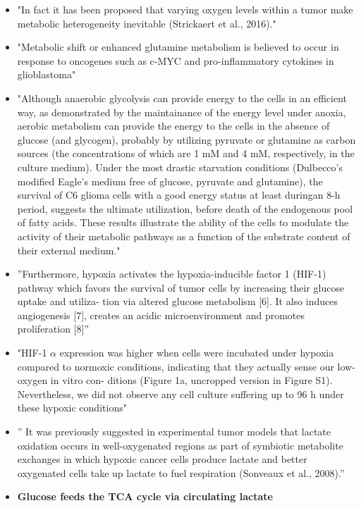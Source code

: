 \documentclass[11pt,a4paper]{article}
\begin{document}
\begin{itemize}
\item "In fact it has been proposed that varying oxygen levels within a tumor make metabolic heterogeneity inevitable (Strickaert et al., 2016)."\cite{Strickland2017}
\item "Metabolic shift or enhanced glutamine metabolism is believed to occur in response to oncogenes such as c-MYC and pro-inflammatory cytokines in glioblastoma" \cite{Stuart2023}
\item "Although anaerobic glycolysis can provide energy to the cells in an efficient way, as demonstrated by the maintainance of the energy level under anoxia, aerobic metabolism
can provide the energy to the cells in the absence of glucose (and glycogen), probably by utilizing pyruvate or glutamine as carbon sources (the concentrations of which are
1 mM and 4 mM, respectively, in the culture medium). Under the most drastic starvation conditions (Dulbecco’s modified Eagle’s medium free of glucose, pyruvate and glutamine), the survival of C6 glioma cells with a good energy status at least duringan
8-h period, suggests the ultimate utilization, before death of the endogenous pool of fatty acids. These results illustrate the ability of the cells to modulate the activity of
their metabolic pathways as a function of the substrate content of their external medium."\cite{Piannet1991}
\item ”Furthermore, hypoxia activates the hypoxia-inducible factor 1 (HIF-1) pathway which favors the survival of tumor cells by increasing their glucose uptake and utiliza-
tion via altered glucose metabolism [6]. It also induces angiogenesis [7], creates an acidic microenvironment and promotes proliferation [8]”\cite{Shen2018}
\item "HIF-1 $\alpha$ expression was higher when cells were incubated under hypoxia compared
to normoxic conditions, indicating that they actually sense our low-oxygen in vitro con-
ditions (Figure 1a, uncropped version in Figure S1). Nevertheless, we did not observe
any cell culture suffering up to 96 h under these hypoxic conditions"\cite{Bailleul2021}
\item ” It was previously suggested in experimental tumor models that lactate oxidation occurs in well-oxygenated regions as part of symbiotic metabolite exchanges in which hypoxic cancer cells produce lactate and better oxygenated cells take up lactate to fuel respiration (Sonveaux et al., 2008).”\cite{Faubert2017}
 \item \textbf{Glucose feeds the TCA cycle via circulating lactate}  \cite{Hui2017}

\end{itemize}
\end{document}

